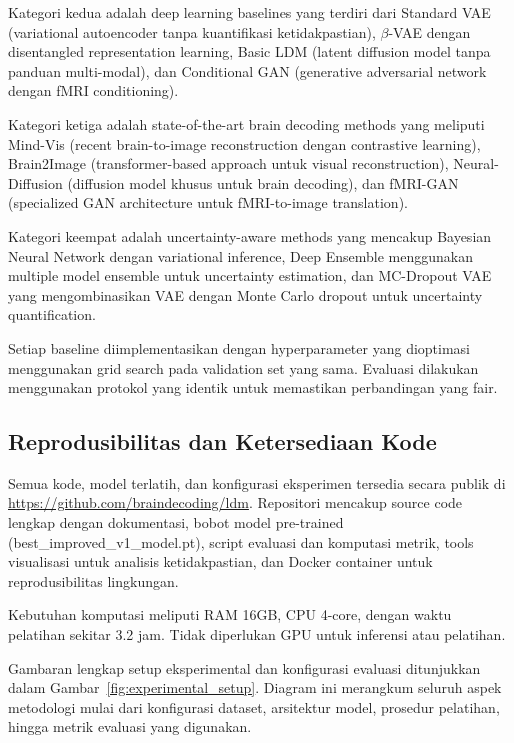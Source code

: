 Kategori kedua adalah deep learning baselines yang terdiri dari Standard VAE (variational autoencoder tanpa kuantifikasi ketidakpastian), $\beta$-VAE dengan disentangled representation learning, Basic LDM (latent diffusion model tanpa panduan multi-modal), dan Conditional GAN (generative adversarial network dengan fMRI conditioning).

Kategori ketiga adalah state-of-the-art brain decoding methods yang meliputi Mind-Vis (recent brain-to-image reconstruction dengan contrastive learning), Brain2Image (transformer-based approach untuk visual reconstruction), Neural-Diffusion (diffusion model khusus untuk brain decoding), dan fMRI-GAN (specialized GAN architecture untuk fMRI-to-image translation).

Kategori keempat adalah uncertainty-aware methods yang mencakup Bayesian Neural Network dengan variational inference, Deep Ensemble menggunakan multiple model ensemble untuk uncertainty estimation, dan MC-Dropout VAE yang mengombinasikan VAE dengan Monte Carlo dropout untuk uncertainty quantification.

Setiap baseline diimplementasikan dengan hyperparameter yang dioptimasi menggunakan grid search pada validation set yang sama. Evaluasi dilakukan menggunakan protokol yang identik untuk memastikan perbandingan yang fair.

\subsection{Reprodusibilitas dan Ketersediaan Kode}

Semua kode, model terlatih, dan konfigurasi eksperimen tersedia secara publik di \url{https://github.com/braindecoding/ldm}. Repositori mencakup source code lengkap dengan dokumentasi, bobot model pre-trained (best\_improved\_v1\_model.pt), script evaluasi dan komputasi metrik, tools visualisasi untuk analisis ketidakpastian, dan Docker container untuk reprodusibilitas lingkungan.

Kebutuhan komputasi meliputi RAM 16GB, CPU 4-core, dengan waktu pelatihan sekitar 3.2 jam. Tidak diperlukan GPU untuk inferensi atau pelatihan.

Gambaran lengkap setup eksperimental dan konfigurasi evaluasi ditunjukkan dalam Gambar~\ref{fig:experimental_setup}. Diagram ini merangkum seluruh aspek metodologi mulai dari konfigurasi dataset, arsitektur model, prosedur pelatihan, hingga metrik evaluasi yang digunakan.

